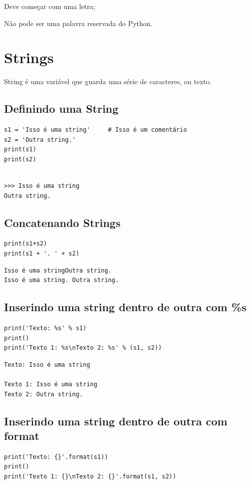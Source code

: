 \documentclass[presentation]{beamer}
\begin{document}
Deve começar com uma letra;

Não pode ser uma palavra reservada do Python.
\section{Strings}
\label{sec:orgheadline33}
String é uma variável que guarda uma série de caracteres, ou texto.

\subsection{Definindo uma String}
\label{sec:orgheadline25}
\begin{verbatim}
s1 = 'Isso é uma string'     # Isso é um comentário
s2 = 'Outra string.'
print(s1)
print(s2)
\end{verbatim}

\begin{verbatim}

>>> Isso é uma string
Outra string.
\end{verbatim}

\subsection{Concatenando Strings}
\label{sec:orgheadline26}
\begin{verbatim}
print(s1+s2)
print(s1 + '. ' + s2)
\end{verbatim}

\begin{verbatim}
Isso é uma stringOutra string.
Isso é uma string. Outra string.
\end{verbatim}


\subsection{Inserindo uma string dentro de outra com \%s}
\label{sec:orgheadline27}
\begin{verbatim}
print('Texto: %s' % s1)
print()
print('Texto 1: %s\nTexto 2: %s' % (s1, s2))
\end{verbatim}

\begin{verbatim}
Texto: Isso é uma string

Texto 1: Isso é uma string
Texto 2: Outra string.
\end{verbatim}

\subsection{Inserindo uma string dentro de outra com format}
\label{sec:orgheadline28}
\begin{verbatim}
print('Texto: {}'.format(s1))
print()
print('Texto 1: {}\nTexto 2: {}'.format(s1, s2))
\end{verbatim}
\end{document}
